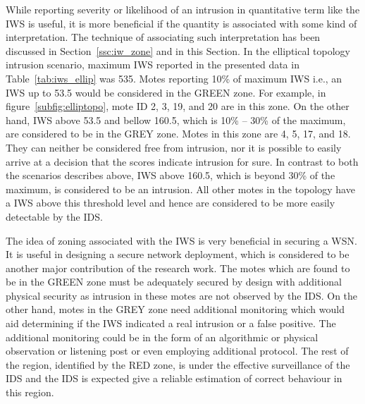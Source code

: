 \documentclass[conference,final]{IEEEtran}
\newcommand{\notedme}[1]{\raisebox{0pt}[0pt][0pt]{\pdfcomment[open=true,color=blue]{#1}}}
\begin{document}
While reporting severity or likelihood of an intrusion in quantitative term like the IWS is useful, it is more beneficial if the quantity is associated with some kind of interpretation.
The technique of associating such interpretation has been discussed in Section~\ref{ssc:iw_zone} and in this Section. 
In the elliptical topology intrusion scenario, maximum IWS reported in the presented data in Table~\ref{tab:iws_ellip} was 535. 
Motes reporting 10\% of maximum IWS i.e., an IWS up to 53.5 would be considered in the GREEN zone.
For example, in figure~\ref{subfig:elliptopo}, mote ID 2, 3, 19, and 20 are in this zone.
On the other hand, IWS above 53.5 and bellow 160.5, which is 10\% -- 30\% of the maximum, are considered to be in the GREY zone. 
Motes in this zone are 4, 5, 17, and 18.
They can neither be considered free from intrusion, nor it is possible to easily arrive at a decision that the scores indicate intrusion for sure.
In contrast to both the scenarios describes above, IWS above 160.5, which is beyond 30\% of the maximum, is considered to be an intrusion.
All other motes in the topology have a IWS above this threshold level and hence are considered to be more easily detectable by the IDS. %

The idea of zoning associated with the IWS is very beneficial in securing a WSN.
It is useful in designing a secure network deployment, which is considered to be another major contribution of the research work.
The motes which are found to be in the GREEN zone must be adequately secured by design with additional physical security as intrusion in these motes are not observed by the IDS.
On the other hand, motes in the GREY zone need additional monitoring which would aid determining if the IWS indicated a real intrusion or a false positive.
The additional monitoring could be in the form of an algorithmic or physical observation or listening post or even employing additional protocol.
The rest of the region, identified by the RED zone, is under the effective surveillance of the IDS and the IDS is expected give a reliable estimation of correct behaviour in this region.
\end{document}
